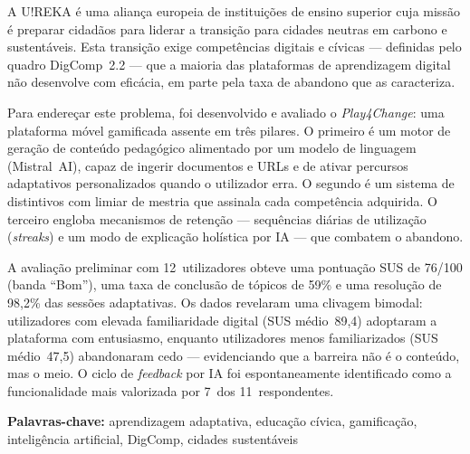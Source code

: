 \abstractPT  %

A U!REKA é uma aliança europeia de instituições de ensino superior cuja missão é preparar cidadãos para liderar a transição para cidades neutras em carbono e sustentáveis. Esta transição exige competências digitais e cívicas --- definidas pelo quadro DigComp~2.2 --- que a maioria das plataformas de aprendizagem digital não desenvolve com eficácia, em parte pela taxa de abandono que as caracteriza.

Para endereçar este problema, foi desenvolvido e avaliado o \emph{Play4Change}: uma plataforma móvel gamificada assente em três pilares. O primeiro é um motor de geração de conteúdo pedagógico alimentado por um modelo de linguagem (Mistral~AI), capaz de ingerir documentos e URLs e de ativar percursos adaptativos personalizados quando o utilizador erra. O segundo é um sistema de distintivos com limiar de mestria que assinala cada competência adquirida. O terceiro engloba mecanismos de retenção --- sequências diárias de utilização (\emph{streaks}) e um modo de explicação holística por IA --- que combatem o abandono.

A avaliação preliminar com 12~utilizadores obteve uma pontuação SUS de 76/100 (banda ``Bom''), uma taxa de conclusão de tópicos de 59\% e uma resolução de 98,2\% das sessões adaptativas. Os dados revelaram uma clivagem bimodal: utilizadores com elevada familiaridade digital (SUS médio~89,4) adoptaram a plataforma com entusiasmo, enquanto utilizadores menos familiarizados (SUS médio~47,5) abandonaram cedo --- evidenciando que a barreira não é o conteúdo, mas o meio. O ciclo de \emph{feedback} por IA foi espontaneamente identificado como a funcionalidade mais valorizada por 7~dos 11~respondentes.

\vspace{0.5cm}
\noindent\textbf{Palavras-chave:} aprendizagem adaptativa, educação cívica, gamificação, inteligência artificial, DigComp, cidades sustentáveis
